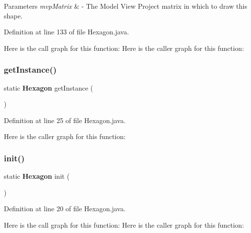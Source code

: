\begin{DoxyParams}{Parameters}
{\em mvp\+Matrix} & -\/ The Model View Project matrix in which to draw this shape. \\
\hline
\end{DoxyParams}


Definition at line 133 of file Hexagon.\+java.

Here is the call graph for this function\+:
Here is the caller graph for this function\+:
\mbox{\label{classru_1_1litun_1_1unitingtwist_1_1_hexagon_a0428295cb76ddb8aaa39007c6e98a294}} 
\subsubsection{get\+Instance()}
{\footnotesize\ttfamily static \textbf{ Hexagon} get\+Instance (\begin{DoxyParamCaption}{ }\end{DoxyParamCaption})\hspace{0.3cm}{\ttfamily [static]}}



Definition at line 25 of file Hexagon.\+java.

Here is the caller graph for this function\+:
\mbox{\label{classru_1_1litun_1_1unitingtwist_1_1_hexagon_a6bacb22e3ae6e84e8dd537d4f92b8e68}} 
\subsubsection{init()}
{\footnotesize\ttfamily static \textbf{ Hexagon} init (\begin{DoxyParamCaption}{ }\end{DoxyParamCaption})\hspace{0.3cm}{\ttfamily [static]}}



Definition at line 20 of file Hexagon.\+java.

Here is the call graph for this function\+:
Here is the caller graph for this function\+:
\mbox{\label{classru_1_1litun_1_1unitingtwist_1_1_hexagon_a5061e0bcf0ce4e87bfae8db5d387b2ea}} 

